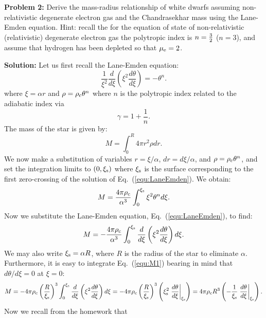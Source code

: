 \documentclass[12pt]{article}
\def\rhoc{\textcolor{red}{\rho}}
\def\xis{\xi_{\rm s}}
\def\rhoc{\rho_{\rm c}}
\begin{document}
{\bf Problem 2:} Derive the mass-radius relationship of white dwarfs
assuming non-relativistic degenerate electron gas and the
Chandrasekhar mass using the Lane-Emden equation. Hint: recall the for
the equation of state of non-relativistic (relativistic) degenerate
electron gas the polytropic index is $n={3 \over 2}$ ($n=3$), and
assume that hydrogen has been depleted so that $\mu_{\rm e} = 2$.

{\bf Solution:} Let us first recall the Lane-Emden equation:
\begin{equation}
\frac{1}{\xi^2} \frac{d}{d\xi} \left(\xi^2 \frac{d\theta}{d\xi} \right) = -\theta^n.\label{equ:LaneEmden}
\end{equation}
where $\xi = \alpha r$ and $\rho = \rhoc \theta^n$ where $n$ is the
polytropic index related to the adiabatic index via
\begin{equation}
\gamma = 1 + \frac{1}{n}.
\end{equation}
The mass of the star is given by:
\begin{equation}
M = \int_0^R 4\pi r^2 \rho dr.
\end{equation}
We now make a substitution of variables $r = \xi/\alpha$, $dr =
d\xi/\alpha$, and $\rho = \rhoc \theta^n$, and set the integration
limits to $(0,\xis)$ where $\xis$ is the surface corresponding to the
first zero-crossing of the solution of Eq.~(\ref{equ:LaneEmden}). We
obtain:
\begin{equation}
M = \frac{4\pi \rhoc}{\alpha^3} \int_0^{\xis} \xi^2 \theta^n d\xi.
\end{equation}
Now we substitute the Lane-Emden equation, Eq.~(\ref{equ:LaneEmden}),
to find:
\begin{equation}
M = -\frac{4\pi \rhoc}{\alpha^3} \int_0^{\xis} \frac{d}{d\xi} \left(\xi^2 \frac{d\theta}{d\xi} \right) d\xi.\label{equ:M1}
\end{equation}
We may also write $\xis = \alpha R$, where $R$ is the radius of the
star to eliminate $\alpha$. Furthermore, it is easy to integrate
Eq.~(\ref{equ:M1}) bearing in mind that $d\theta/d\xi =0$ at $\xi=0$:
\begin{equation}
M = -4\pi \rhoc \left(\frac{R}{\xis}\right)^3 \int_0^{\xis} \frac{d}{d\xi} \left(\xi^2 \frac{d\theta}{d\xi} \right) d\xi = -4\pi \rhoc \left(\frac{R}{\xis}\right)^3 \left(\xis^2 \left.\frac{d\theta}{d\xi}\right|_{\xis} \right) = 4\pi \rhoc R^3 \left(- \frac{1}{\xis} \left.\frac{d\theta}{d\xi}\right|_{\xis} \right).\label{equ:M2}
\end{equation}
Now we recall from the homework that
\end{document}
